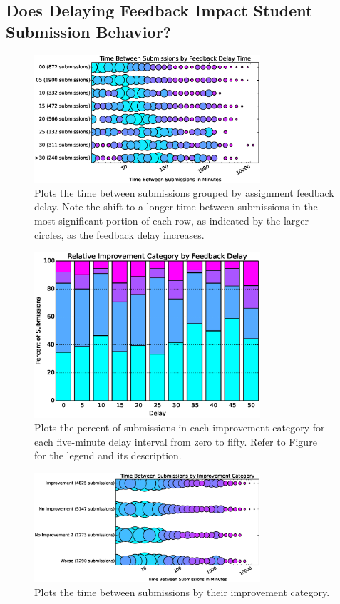 \subsection{Does Delaying Feedback Impact Student Submission Behavior?}

\begin{figure}[!t]
\centering
\includegraphics[width=3.3in]{graphs/Time_Between_Submissions_by_Feedback_Delay_Time.eps}
\caption{Plots the time between submissions grouped by assignment feedback
  delay. Note the shift to a longer time between submissions in the most
  significant portion of each row, as indicated by the larger circles, as the
  feedback delay increases.}
\end{figure}

\begin{figure}[!t]
\centering
\includegraphics[width=3.3in]{graphs/Relative_Improvement_Category_by_Feedback_Delay.eps}
\caption{Plots the percent of submissions in each improvement category for each
  five-minute delay interval from zero to fifty. Refer to
  Figure~ for the legend and its description.}
\end{figure}

\begin{figure}[!t]
\centering \includegraphics[width=3.3in]{graphs/Time_Between_Submissions_by_Improvement_Category.eps}
\caption{Plots the time between submissions by their improvement category.}
\end{figure}

